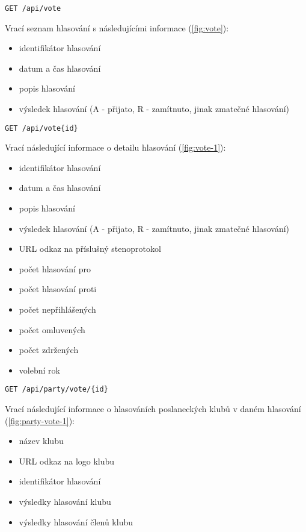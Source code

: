 \begin{lstlisting}
GET /api/vote
\end{lstlisting}

\noindent Vrací seznam hlasování s následujícími informace (\ref{fig:vote}):
\begin{itemize}
	\item identifikátor hlasování
	\item datum a čas hlasování
	\item popis hlasování
	\item výsledek hlasování (A - přijato, R - zamítnuto, jinak zmatečné hlasování)
\end{itemize}

\vspace{10px}

\begin{lstlisting}
GET /api/vote{id}
\end{lstlisting}

\noindent Vrací následující informace o detailu hlasování (\ref{fig:vote-1}):
\begin{itemize}
	\item identifikátor hlasování
	\item datum a čas hlasování
	\item popis hlasování
	\item výsledek hlasování (A - přijato, R - zamítnuto, jinak zmatečné hlasování)
	\item URL odkaz na příslušný stenoprotokol
	\item počet hlasování pro
	\item počet hlasování proti
	\item počet nepřihlášených
	\item počet omluvených
	\item počet zdržených
	\item volební rok
\end{itemize}

\vspace{10px}

\begin{lstlisting}
GET /api/party/vote/{id}
\end{lstlisting}

\noindent Vrací následující informace o hlasováních poslaneckých klubů v daném hlasování (\ref{fig:party-vote-1}):

\begin{itemize}
	\item název klubu
	\item URL odkaz na logo klubu
	\item identifikátor hlasování
	\item výsledky hlasování klubu
	\item výsledky hlasování členů klubu
\end{itemize}

